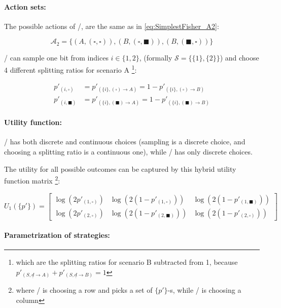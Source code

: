 \documentclass{article}
\newcommand{\wb}{\square}
\newcommand{\bb}{\blacksquare}
\theoremstyle{definition}
\begin{document}
\paragraph{Action sets:}

The possible actions of \PII/, are the same as in \eqref{eq:SimplestFisher_A2}:

\begin{equation}
    \mathcal{A}_2 = \{ (A, (\wb,\wb)), (B, (\wb,\bb)) ,(B,(\bb,\wb)) \}
\end{equation}

\PI/ can sample one bit from indices $i \in \{1,2\}$, (formally $\mathcal{S}=\{\{1\},\{2\}\}$)
and choose 4 different splitting ratios for scenario A \footnote{which are the splitting ratios for scenario B subtracted from 1, because $p'_{(S, \underline{d} \to A)} + p'_{(S, \underline{d} \to B)}=1$}:

\begin{equation}
    \begin{split}
    p'_{(i,\wb)} &= p'_{(\{i\},(\wb) \to A)} = 1- p'_{(\{i\},(\wb) \to B)} \\
    p'_{(i,\bb)} &= p'_{(\{i\},(\bb) \to A)} = 1- p'_{(\{i\},(\bb) \to B)}
    \end{split}
\end{equation}

\paragraph{Utility function:}

\PI/ has both discrete and continuous choices (sampling is a discrete choice, and choosing a splitting ratio is a continuous one), while \PII/ has only discrete choices.

The utility for all possible outcomes can be captured by this hybrid utility function matrix \footnote{where \PI/ is choosing a row and picks a set of $\{p'\}$-s, while \PII/ is choosing a column}:

\begin{equation}
    U_1(\{p'\}) = 
    \begin{bmatrix}
    \log(2 p'_{(1,\wb)}) & \log(2(1-p'_{(1,\wb)})) & \log(2(1-p'_{(1,\bb)})) \\
    \log(2 p'_{(2,\wb)}) & \log(2(1-p'_{(2,\bb)})) & \log(2(1-p'_{(2,\wb)})) 
    \end{bmatrix}
\end{equation}

\paragraph{Parametrization of strategies:}
\end{document}
